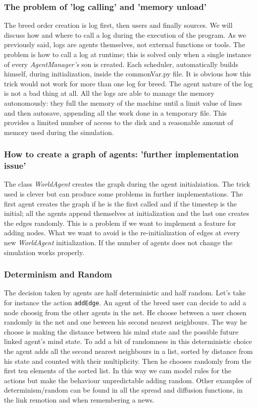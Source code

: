 \subsubsection{The problem of 'log calling' and 'memory unload'}
The breed order creation is log first, then users and finally sources.
We will discuss how and where to call a log during the execution of the program.
As we previously said, logs are agents themselves, not external functions
or tools. The problem is how to call a log at runtime; this is solved
only when a single instance of every \textit{AgentManager's} son is
created. Each scheduler, automatically builds himself, during
initialization, inside the commonVar.py file. It is obvious how this trick
would not work for more than one log for breed.
The agent nature of the log is not a bad thing at all. All the logs are
able to manage the memory autonomously: they full the memory of the machine
until a limit value of lines and then autosave, appending all the work done
in a temporary file. This provides a limited number of access to the disk and
a reasonable amount of memory used during the simulation.

\subsubsection{How to create a graph of agents:
  'further implementation issue'}
The class \textit{WorldAgent} creates the graph during the agent
initialziation. The trick used is clever but can produce some
problems in further implementations. The first agent creates the graph
if he is the first called and if the timestep is the initial; all the
agents append themselves at initialization and the last one creates the edges
randomly. This is a problem if we want to implement a feature for adding nodes.
What we want to avoid is the re-initialization of edges at every new
\textit{WorldAgent} initialization. If the number of agents does not change the
simulation works properly.

\subsubsection{Determinism and Random}
The decision taken by agents are half deterministic and half random.
Let's take for instance the action \texttt{addEdge}.
An agent of the breed user can decide to add a node choosig from the
other agents in the net.
He choose between a user chosen randomly in the net and one beween
his second nearest neighbours.
The way he choose is making the distance between his mind state and the
possible future linked agent's mind state. To add a bit of randomness
in this deterministic choice the agent adds all the second nearest
neighbours in a list, sorted by distance from his state and counted
with their multiplicity. Then he chooses randomly from the first ten
elements of the sorted list. In this way we cam model rules for the
actions but make the behaviour unpredictable adding random.
Other examples of determinism/random can be found in all the spread
and diffusion functions, in the link remotion and when remembering a news. 

